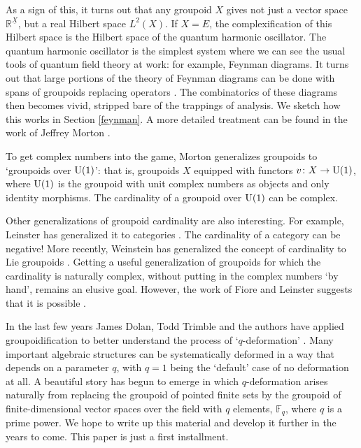 \documentclass{article}
\renewcommand{\to}{\rightarrow}
\newcommand{\maps}{\colon}
\newcommand{\R}{{\mathbb R}}
\newcommand{\F}{{\mathbb F}}
\newcommand{\U}{{\rm U}}
\begin{document}
As a sign of this, it turns out that any groupoid $X$ gives not just a
vector space $\R^{\underline X}$, but a real Hilbert space $L^2(X)$.
If $X = E$, the complexification of this Hilbert space is the Hilbert
space of the quantum harmonic oscillator.  The quantum harmonic
oscillator is the simplest system where we can see the usual tools of
quantum field theory at work: for example, Feynman diagrams.  It turns
out that large portions of the theory of Feynman diagrams can be done
with spans of groupoids replacing operators \cite{BaezDolan:2001}.
The combinatorics of these diagrams then becomes vivid, stripped bare
of the trappings of analysis.  We sketch how this works in Section
\ref{feynman}.  A more detailed treatment can be found in the work of
Jeffrey Morton \cite{Morton:2006}.

To get complex numbers into the game, Morton generalizes groupoids to
`groupoids over $\U(1)$': that is, groupoids $X$ equipped with
functors $v \maps X \to \U(1)$, where $\U(1)$ is the
groupoid with unit complex numbers as objects and only identity 
morphisms.  The cardinality of a groupoid over $\U(1)$ can be complex.

Other generalizations of groupoid cardinality are also interesting.
For example, Leinster has generalized it to categories
\cite{Leinster:2008}.  The cardinality of a category can be negative!
More recently, Weinstein has generalized the concept of cardinality 
to Lie groupoids \cite{Weinstein:2008}.  Getting a useful generalization 
of groupoids for which the cardinality is naturally complex, without 
putting in the complex numbers `by hand', remains an elusive goal.  
However, the work of Fiore and Leinster suggests that it is possible
\cite{FioreLeinster:2005}.

In the last few years James Dolan, Todd Trimble and the authors have
applied groupoidification to better understand the process of
`$q$-deformation' \cite{Baez}.  Many important algebraic structures
can be systematically deformed in a way that depends on a parameter
$q$, with $q = 1$ being the `default' case of no deformation at all.
A beautiful story has begun to emerge in which $q$-deformation arises
naturally from replacing the groupoid of pointed finite sets by the
groupoid of finite-dimensional vector spaces over the field with $q$
elements, $\F_q$, where $q$ is a prime power.  We hope to write up
this material and develop it further in the years to come.  This paper
is just a first installment.
\end{document}
